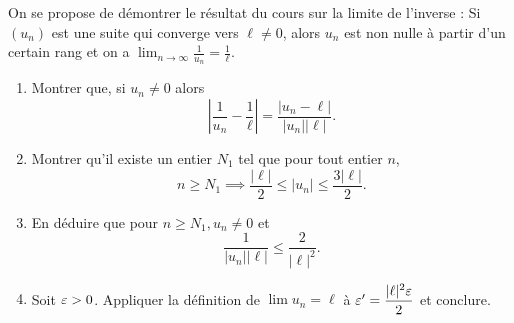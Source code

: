 \documentclass[]{exercices}
\begin{document}
\begin{exercice}[\di]
	On se propose de démontrer le résultat du cours sur la limite de l'inverse :
	Si $(u_n)$ est une suite qui converge vers $\ell\neq0$, alors $u_n$ est non nulle à partir d'un certain rang et on a $\lim_{n\to\infty} \frac{1}{u_n} = \frac{1}{\ell}$.
	\begin{enumerate}
		\item Montrer que, si $u_n\neq 0$ alors 
			\[|\frac1{u_n}-\frac1\ell|=\dfrac{|u_n-\ell|}{|u_n||\ell|}.\]
		\item Montrer qu'il existe un entier $N_1$ tel que pour tout entier $n$,
			\[n\ge N_1\implies \frac{|\ell|}{2}\le|u_n|\le \frac{3|\ell|}{2}.\]
		\item En déduire que pour $n\ge N_1, u_n\ne 0$ et 
			\[\frac{1}{|u_n||\ell|}\le \frac{2}{|\ell|^2}.\]
		\item Soit $\varepsilon>0$. Appliquer la définition de $\lim u_n=\ell$ à $\varepsilon^\prime=\dfrac{|\ell|^2\varepsilon}{2}$ et conclure.
	\end{enumerate}
\end{exercice}
\end{document}
